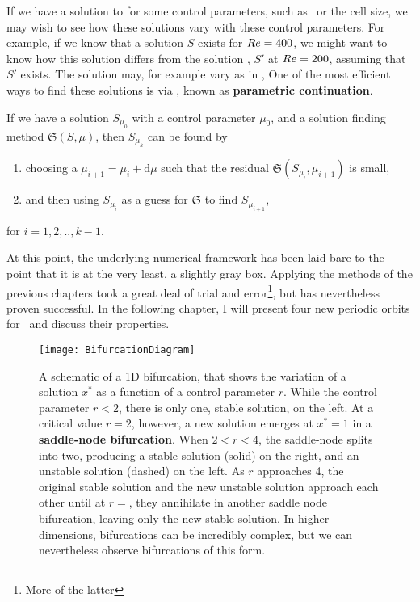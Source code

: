  If we have a solution to  for some control parameters, such as \ReN\ or the cell size, we may wish to see how these solutions vary with these control parameters. For example, if we know that a solution $S$  exists for $Re = 400$, we might want to know how this solution differs from the solution , $S'$ at $Re = 200$, assuming that $S'$ exists. The solution may, for example vary as in ,  One of the most efficient ways to find these solutions is via , known as {\bf parametric continuation}.
 \begin{algorithm}\label{alg:parCont}
 If we have a solution $S_{\mu_0}$ with a control parameter $\mu_0$,  and a solution finding method $\mathfrak{S}(S,\mu)$, then $S_{\mu_k}$ can be found by
 \begin{enumerate}
 \item choosing a $\mu_{i+1} = \mu_{i} + \mathrm{d}\mu$ such that the residual $\mathfrak{S}(S_{\mu_{i}},\mu_{i+1})$ is small,
 \item and then using $S_{\mu_i}$ as a guess for $\mathfrak{S}$ to find $S_{\mu_{i+1}}$,
 \end{enumerate}
 for $i = 1,2,..,k-1$.
 \end{algorithm}
\par
At this point, the underlying numerical framework has been laid bare to the point that it is at the very least, a slightly gray box. Applying the methods of the previous chapters took a great deal of trial and error\footnote{More of the latter}, but has nevertheless proven successful. In the following chapter, I will present four new periodic orbits for \pCf\, and discuss their properties.   
 \begin{figure}[h]
 \texttt{[image: BifurcationDiagram]}
 \caption{A schematic of a 1D bifurcation, that shows the variation of a solution $x^*$ as a function of a control parameter $r$. While the control parameter $r < 2$, there is only one, stable solution, on the left. At a critical value $r = 2$, however, a new solution emerges at $x^* = 1$ in a {\bf saddle-node bifurcation}. When $2 < r < 4$, the saddle-node splits into two, producing a stable solution (solid) on the right, and an unstable solution (dashed) on the left. As $r$ approaches 4, the original stable solution and the new unstable solution approach each other until at $r=$, they annihilate in another saddle node bifurcation, leaving only the new stable solution. In higher dimensions, bifurcations can be incredibly complex, but we can nevertheless observe bifurcations of this form. }\label{fig:bifurcations}
 \end{figure}
 
 